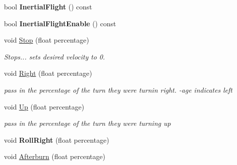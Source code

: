 \begin{DoxyCompactItemize}
\item 
bool {\bfseries Inertial\+Flight} () const \hypertarget{classFlyByWire_a6e7b6d2b30bf89221550478c064196f6}{}\label{classFlyByWire_a6e7b6d2b30bf89221550478c064196f6}

\item 
bool {\bfseries Inertial\+Flight\+Enable} () const \hypertarget{classFlyByWire_a39fe7199c12e3caf0e73b6dd2ce26fc1}{}\label{classFlyByWire_a39fe7199c12e3caf0e73b6dd2ce26fc1}

\item 
void \hyperlink{classFlyByWire_a02e54abfef72087848790346b31e1ee4}{Stop} (float percentage)\hypertarget{classFlyByWire_a02e54abfef72087848790346b31e1ee4}{}\label{classFlyByWire_a02e54abfef72087848790346b31e1ee4}

\begin{DoxyCompactList}\small\item\em Stops... sets desired velocity to 0. \end{DoxyCompactList}\item 
void \hyperlink{classFlyByWire_a322551d7199efa744babab4ada6634a4}{Right} (float percentage)\hypertarget{classFlyByWire_a322551d7199efa744babab4ada6634a4}{}\label{classFlyByWire_a322551d7199efa744babab4ada6634a4}

\begin{DoxyCompactList}\small\item\em pass in the percentage of the turn they were turnin right. -\/age indicates left \end{DoxyCompactList}\item 
void \hyperlink{classFlyByWire_a95f789458a0e84048eb1c5f5a8c4f063}{Up} (float percentage)\hypertarget{classFlyByWire_a95f789458a0e84048eb1c5f5a8c4f063}{}\label{classFlyByWire_a95f789458a0e84048eb1c5f5a8c4f063}

\begin{DoxyCompactList}\small\item\em pass in the percentage of the turn they were turning up \end{DoxyCompactList}\item 
void {\bfseries Roll\+Right} (float percentage)\hypertarget{classFlyByWire_a7ccdbe972b502f304ccff07813cecd09}{}\label{classFlyByWire_a7ccdbe972b502f304ccff07813cecd09}

\item 
void \hyperlink{classFlyByWire_a09437ec17ae996e175aa4d5a1a76e713}{Afterburn} (float percentage)\hypertarget{classFlyByWire_a09437ec17ae996e175aa4d5a1a76e713}{}\label{classFlyByWire_a09437ec17ae996e175aa4d5a1a76e713}


\end{DoxyCompactItemize}
